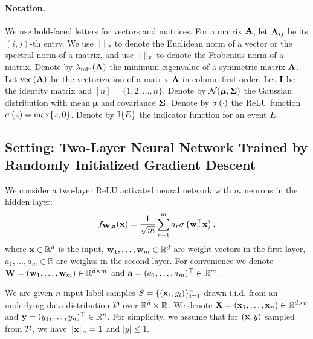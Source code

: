 


\paragraph{Notation.}
We use bold-faced letters for vectors and matrices. For a matrix $\mathbf{A}$, let $\mathbf{A}_{ij}$ be its $(i, j)$-th entry.
We use $\left\|\cdot\right\|_2$ to denote the Euclidean norm of a vector or the spectral norm of a matrix, and use $\left\|\cdot\right\|_F$ to denote the Frobenius norm of a matrix.
Denote by $\lambda_{\min}(\mathbf{A})$ the minimum eigenvalue of a symmetric matrix $\mathbf{A}$.
Let $\text{vec}\left(\mathbf{A}\right)$ be the vectorization of a matrix $\mathbf{A}$ in column-first order.
Let $\mathbf{I}$ be the identity matrix and $[n]=\{1, 2, \ldots, n\}$.
Denote by $\mathcal{N}(\bm\mu, \mathbf{\Sigma})$ the Gaussian distribution with mean $\bm\mu$ and covariance $\mathbf{\Sigma}$.
Denote by $\sigma\left(\cdot\right)$ the ReLU function $\sigma\left(z\right) = \max\{z, 0\}$.
Denote by $\mathbb{I}\{E\}$ the indicator function for an event $E$.


\subsection{Setting: Two-Layer Neural Network Trained by Randomly Initialized Gradient Descent} \label{sec:setup}

We consider a two-layer ReLU activated neural network with $m$ neurons in the hidden layer:
\begin{align*}
f_{\mathbf{W},\mathbf{a}}(\mathbf{x}) = \frac{1}{\sqrt{m}}\sum_{r=1}^{m} a_r \sigma\left(\mathbf{w}_r^\top \mathbf{x}\right),
\end{align*}
where $\mathbf{x}\in \mathbb{R}^d$ is the input, $\mathbf{w}_1, \ldots, \mathbf{w}_m \in \mathbb{R}^d$ are weight vectors in the first layer, $a_1, \ldots, a_m \in \mathbb{R}$ are weights in the second layer.
For convenience we denote $\mathbf{W} = (\mathbf{w}_1, \ldots, \mathbf{w}_m) \in \mathbb{R}^{d\times m}$ and $\mathbf{a} = (a_1, \ldots, a_m)^\top \in \mathbb{R}^m$.

We are given $n$ input-label samples $S = \{ (\mathbf{x}_i, y_i) \}_{i=1}^n$ drawn i.i.d. from an underlying data distribution $\mathcal{D}$ over $\mathbb{R}^d\times \mathbb{R}$.
We denote $\mathbf{X} = (\mathbf{x}_1, \ldots, \mathbf{x}_n) \in \mathbb{R}^{d\times n}$ and $\mathbf{y} = (y_1, \ldots, y_n)^\top \in \mathbb{R}^n$.
For simplicity, we assume that for $(\mathbf{x}, y)$ sampled from $\mathcal{D}$, we have $\left\|\mathbf{x}\right\|_2=1$ and $|y|\le1$.

